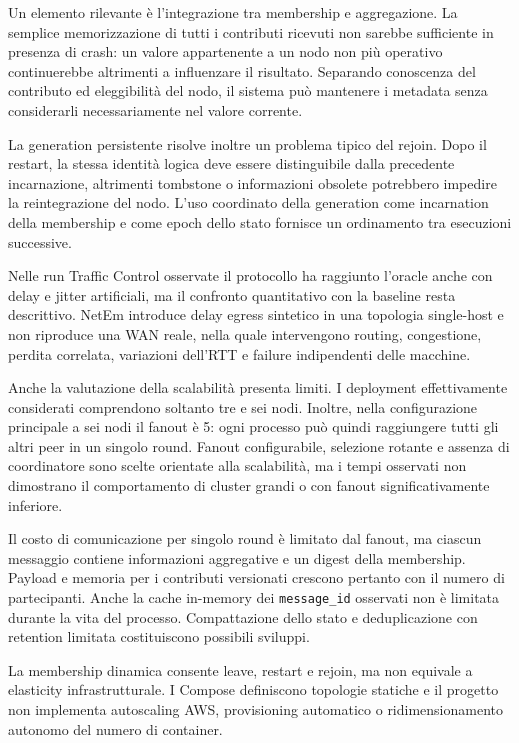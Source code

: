 \documentclass[conference]{IEEEtran}
\begin{document}
Un elemento rilevante è l'integrazione tra membership e aggregazione. La semplice memorizzazione di tutti i contributi ricevuti non sarebbe sufficiente in presenza di crash: un valore appartenente a un nodo non più operativo continuerebbe altrimenti a influenzare il risultato. Separando conoscenza del contributo ed eleggibilità del nodo, il sistema può mantenere i metadata senza considerarli necessariamente nel valore corrente.

La generation persistente risolve inoltre un problema tipico del rejoin. Dopo il restart, la stessa identità logica deve essere distinguibile dalla precedente incarnazione, altrimenti tombstone o informazioni obsolete potrebbero impedire la reintegrazione del nodo. L'uso coordinato della generation come incarnation della membership e come epoch dello stato fornisce un ordinamento tra esecuzioni successive.

Nelle run Traffic Control osservate il protocollo ha raggiunto l'oracle anche con delay e jitter artificiali, ma il confronto quantitativo con la baseline resta descrittivo. NetEm introduce delay egress sintetico in una topologia single-host e non riproduce una WAN reale, nella quale intervengono routing, congestione, perdita correlata, variazioni dell'RTT e failure indipendenti delle macchine.

Anche la valutazione della scalabilità presenta limiti. I deployment effettivamente considerati comprendono soltanto tre e sei nodi. Inoltre, nella configurazione principale a sei nodi il fanout è 5: ogni processo può quindi raggiungere tutti gli altri peer in un singolo round. Fanout configurabile, selezione rotante e assenza di coordinatore sono scelte orientate alla scalabilità, ma i tempi osservati non dimostrano il comportamento di cluster grandi o con fanout significativamente inferiore.

Il costo di comunicazione per singolo round è limitato dal fanout, ma ciascun messaggio contiene informazioni aggregative e un digest della membership. Payload e memoria per i contributi versionati crescono pertanto con il numero di partecipanti. Anche la cache in-memory dei \texttt{message\_id} osservati non è limitata durante la vita del processo. Compattazione dello stato e deduplicazione con retention limitata costituiscono possibili sviluppi.

La membership dinamica consente leave, restart e rejoin, ma non equivale a elasticity infrastrutturale. I Compose definiscono topologie statiche e il progetto non implementa autoscaling AWS, provisioning automatico o ridimensionamento autonomo del numero di container.
\end{document}
